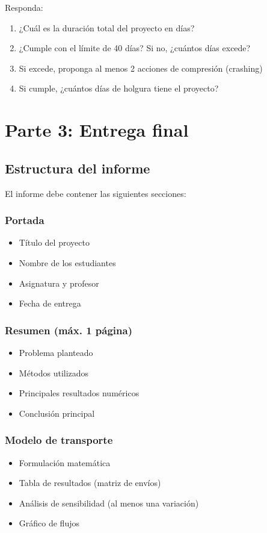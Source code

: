\documentclass[12pt,a4paper]{article}
\begin{document}
	Responda:
	
	\begin{enumerate}
		\item ¿Cuál es la duración total del proyecto en días?
		\item ¿Cumple con el límite de 40 días? Si no, ¿cuántos días excede?
		\item Si excede, proponga al menos 2 acciones de compresión (crashing)
		\item Si cumple, ¿cuántos días de holgura tiene el proyecto?
	\end{enumerate}
	
	\newpage
	
	\section{Parte 3: Entrega final}
	
	\subsection{Estructura del informe}
	
	El informe debe contener las siguientes secciones:
	
	\subsubsection{Portada}
	\begin{itemize}
		\item Título del proyecto
		\item Nombre de los estudiantes
		\item Asignatura y profesor
		\item Fecha de entrega
	\end{itemize}
	
	\subsubsection{Resumen (máx. 1 página)}
	\begin{itemize}
		\item Problema planteado
		\item Métodos utilizados
		\item Principales resultados numéricos
		\item Conclusión principal
	\end{itemize}
	
	\subsubsection{Modelo de transporte}
	\begin{itemize}
		\item Formulación matemática
		\item Tabla de resultados (matriz de envíos)
		\item Análisis de sensibilidad (al menos una variación)
		\item Gráfico de flujos 
	\end{itemize}
	
\end{document}
